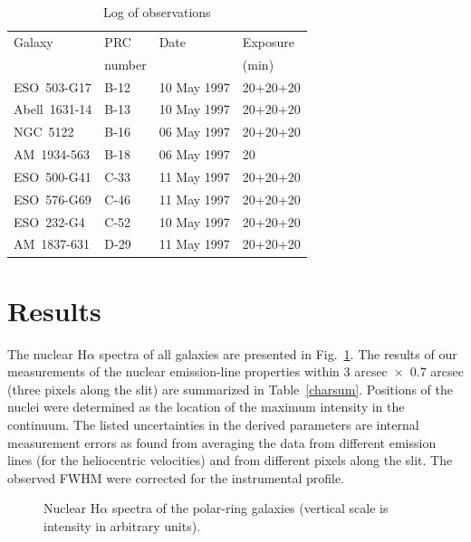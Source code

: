 \setcounter{table}{0}
\begin{table}
\caption[]{Log of observations}
\label{logobs}
\begin{tabular}{llll}
\\
\hline
Galaxy &   PRC          & Date & Exposure    \\
       &   number       &      &  (min)      \\
\hline 
ESO~503-G17  & B-12 & 10 May 1997 & 20+20+20         \\
Abell~1631-14& B-13 & 10 May 1997 & 20+20+20         \\
NGC~5122     & B-16 & 06 May 1997 & 20+20+20         \\
AM~1934-563  & B-18 & 06 May 1997 & 20              \\
ESO~500-G41  & C-33 & 11 May 1997 & 20+20+20        \\
ESO~576-G69  & C-46 & 11 May 1997 & 20+20+20        \\
ESO~232-G4   & C-52 & 10 May 1997 & 20+20+20         \\
AM~1837-631  & D-29 & 11 May 1997 & 20+20+20        \\
\hline
\end{tabular}
\end{table}

\section{Results}

The  nuclear   H$\alpha$   spectra  of  all  galaxies   are   presented  in
Fig.~\ref{nucsp}.  The  results  of  our   measurements   of  the   nuclear
emission-line properties within 3 arcsec~$\times$~0.7  arcsec (three pixels
along the slit) are  summarized  in  Table~\ref{charsum}.  Positions of the
nuclei were  determined  as the  location of the maximum  intensity  in the
continuum.  The listed uncertainties in the derived parameters are internal
measurement errors as found from averaging the data from different emission
lines (for the heliocentric velocities) and from different pixels along the
slit.  The observed FWHM were corrected for the instrumental profile.  \\

\setcounter{figure}{0}
\begin{figure}
\caption{Nuclear  H$\alpha$  spectra of the polar-ring  galaxies  (vertical
scale is intensity in arbitrary units).}
\label{nucsp}
\end{figure}

